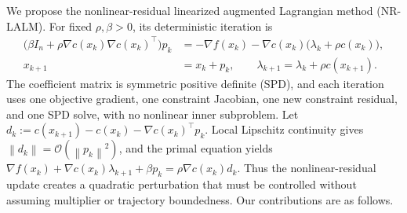 \documentclass[11pt]{article}
\theoremstyle{definition}
\theoremstyle{remark}
\numberwithin{equation}{section}
\numberwithin{figure}{section}
\numberwithin{table}{section}
\numberwithin{algorithm}{section}
\newcommand{\cO}{\mathcal{O}}
\newcommand{\norm}[1]{\left\lVert #1\right\rVert}
\newcommand{\grad}{\nabla}
\begin{document}
We propose the nonlinear-residual linearized augmented Lagrangian method (NR-LALM).  For fixed $\rho,\beta>0$, its deterministic iteration is
$$
\begin{aligned}
\bigl(\beta I_n+\rho\grad c(x_k)\grad c(x_k)^\top\bigr)p_k
&=
-\grad f(x_k)-\grad c(x_k)\bigl(\lambda_k+\rho c(x_k)\bigr),\\
x_{k+1}&=x_k+p_k,
\qquad
\lambda_{k+1}=\lambda_k+\rho c(x_{k+1}).
\end{aligned}
$$
The coefficient matrix is symmetric positive definite (SPD), and each iteration uses one objective gradient, one constraint Jacobian, one new constraint residual, and one SPD solve, with no nonlinear inner subproblem. Let $d_k:=c(x_{k+1})-c(x_k)-\grad c(x_k)^\top p_k$.  Local Lipschitz continuity gives $\norm{d_k}=\cO(\norm{p_k}^2)$, and the primal equation yields
$\grad f(x_k)+\grad c(x_k)\lambda_{k+1}+\beta p_k=\rho\grad c(x_k)d_k$. Thus the nonlinear-residual update creates a quadratic perturbation that must be controlled without assuming multiplier or trajectory boundedness.  Our contributions are as follows.
\end{document}
